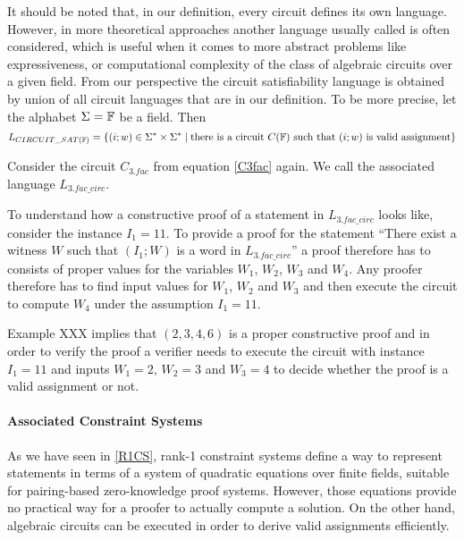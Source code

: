 \begin{remark} It should be noted that, in our definition, every circuit defines its own language. However,  in more theoretical approaches another language usually called  is often considered, which is useful when it comes to more abstract problems like expressiveness, or computational complexity of the class of  algebraic circuits over a given field. From our perspective the circuit satisfiability language is obtained by union of all circuit languages that are in our definition. To be more precise, let the alphabet $\Sigma=\mathbb{F}$ be a field. Then 
$$
L_{CIRCUIT\_SAT(\mathbb{F})} = \{(i;w)\in \Sigma^*\times \Sigma^*\;|\; \text{there is a circuit } C(\mathbb{F}) \text{ such that } (i;w) \text{ is valid assignment}\}
$$
\end{remark}
\begin{example}[3-Factorization]Consider the circuit $C_{3.fac}$ from equation \ref{C3fac} again. We call the associated language $L_{3.fac\_circ}$.

To understand how a constructive proof of a statement in $L_{3.fac\_circ}$ looks like, consider the instance $I_1= 11$. To provide a proof for the statement ``There exist a witness $W$ such that $(I_1;W)$ is a word in $L_{3.fac\_circ}$'' a proof therefore has to consists of proper values for the variables $W_1$, $W_2$, $W_3$ and $W_4$. Any proofer therefore has to find input values for $W_1$, $W_2$ and $W_3$ and then execute the circuit to compute $W_4$ under the assumption $I_1=11$. 

Example XXX implies that $(2,3,4,6)$ is a proper constructive proof and in order to verify the proof a verifier needs to execute the circuit with instance $I_1=11$ and inputs $W_1=2$, $W_2=3$ and $W_3=4$ to decide whether the proof is a valid assignment or not. 
\end{example}
\paragraph{Associated Constraint Systems} As we have seen in \ref{R1CS}, rank-1 constraint systems define a way to represent statements in terms of a system of quadratic equations over finite fields, suitable for pairing-based zero-knowledge proof systems. However,  those equations provide no practical way for a proofer to actually compute a solution. On the other hand, algebraic circuits can be executed in order to derive valid assignments efficiently. 

